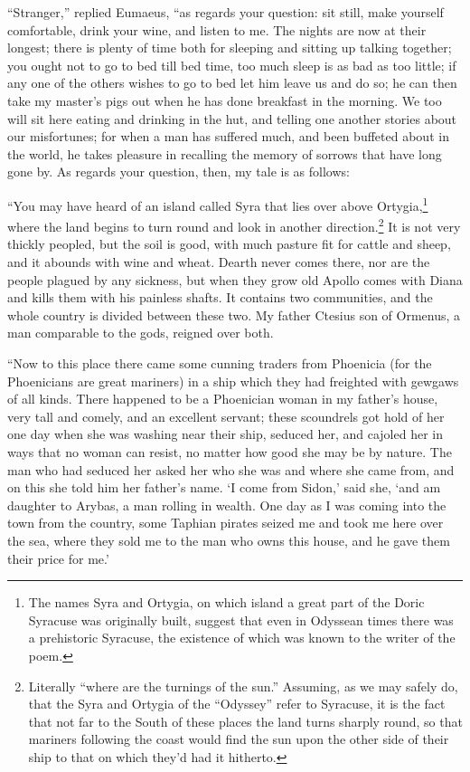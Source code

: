 “Stranger,” replied Eumaeus, “as regards your question: sit still, make
yourself comfortable, drink your wine, and listen to me. The nights are now at
their longest; there is plenty of time both for sleeping and sitting up talking
together; you ought not to go to bed till bed time, too much sleep is as bad as
too little; if any one of the others wishes to go to bed let him leave us and
do so; he can then take my master’s pigs out when he has done breakfast in the
morning. We too will sit here eating and drinking in the hut, and telling one
another stories about our misfortunes; for when a man has suffered much, and
been buffeted about in the world, he takes pleasure in recalling the memory of
sorrows that have long gone by. As regards your question, then, my tale is as
follows:

“You may have heard of an island called Syra that lies over above Ortygia,\footnote{The names Syra and Ortygia, on which island a great part of the Doric
Syracuse was originally built, suggest that even in Odyssean times there was a
prehistoric Syracuse, the existence of which was known to the writer of the
poem.} where the land
begins to turn round and look in another direction.\footnote{Literally “where are the turnings of the sun.” Assuming, as we may safely
do, that the Syra and Ortygia of the “Odyssey” refer to Syracuse, it is the
fact that not far to the South of these places the land turns sharply round,
so that mariners following the coast would find the sun upon the other side of
their ship to that on which they’d had it hitherto.} It is not very thickly peopled, but
the soil is good, with much pasture fit for cattle and sheep, and it abounds
with wine and wheat. Dearth never comes there, nor are the people plagued by
any sickness, but when they grow old Apollo comes with Diana and kills them
with his painless shafts. It contains two communities, and the whole country is
divided between these two. My father Ctesius son of Ormenus, a man comparable
to the gods, reigned over both.

“Now to this place there came some cunning traders from Phoenicia (for the
Phoenicians are great mariners) in a ship which they had freighted with gewgaws
of all kinds. There happened to be a Phoenician woman in my father’s house,
very tall and comely, and an excellent servant; these scoundrels got hold of
her one day when she was washing near their ship, seduced her, and cajoled her
in ways that no woman can resist, no matter how good she may be by nature. The
man who had seduced her asked her who she was and where she came from, and on
this she told him her father’s name. ‘I come from Sidon,’ said she, ‘and am
daughter to Arybas, a man rolling in wealth. One day as I was coming into the
town from the country, some Taphian pirates seized me and took me here over the
sea, where they sold me to the man who owns this house, and he gave them their
price for me.’

